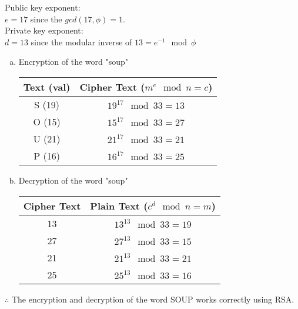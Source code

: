 \documentclass[fleqn, 12pt]{article}
\begin{document}
Public key exponent:\\
$e = 17$ since the $gcd(17, \phi) = 1$.\\


Private key exponent:\\
$d = 13$ since the modular inverse of $13 = e^{-1} \mod \phi$

\begin{enumerate}[a)]
    \item
        Encryption of the word "soup"

        \begin{tabular}{|c|c|}
            \hline
                Text (val) & Cipher Text ($m^e \mod n = c$)\\\hline
                S (19)       & $19^17 \mod 33 = 13$ \\\hline
                O (15)       & $15^17 \mod 33 = 27$ \\\hline
                U (21)       & $21^17 \mod 33 = 21$ \\\hline
                P (16)       & $16^17 \mod 33 = 25$ \\
            \hline
        \end{tabular}

    \item
        Decryption of the word "soup"

        \begin{tabular}{|c|c|}
            \hline
                Cipher Text & Plain Text ($c^d \mod n = m$)\\\hline
                13          & $13^13 \mod 33 = 19$ \\\hline
                27          & $27^13 \mod 33 = 15$ \\\hline
                21          & $21^13 \mod 33 = 21$ \\\hline
                25          & $25^13 \mod 33 = 16$ \\
            \hline
        \end{tabular}

\end{enumerate}

$\therefore$ The encryption and decryption of the word SOUP works correctly using RSA.
\end{document}

